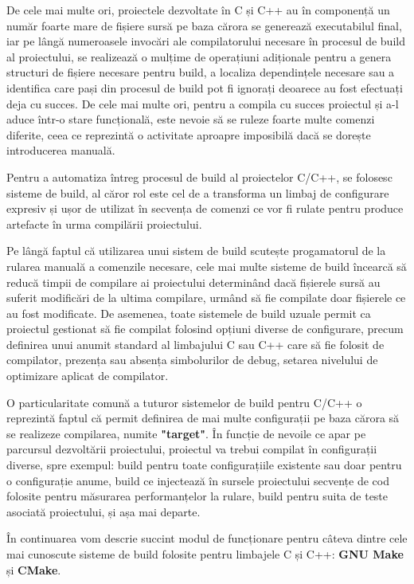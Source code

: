 De cele mai multe ori, proiectele dezvoltate în C și C++ au în componență un număr
foarte mare de fișiere sursă pe baza cărora se generează executabilul final, iar pe
lângă numeroasele invocări ale compilatorului necesare în procesul de build al proiectului,
se realizează o mulțime de operațiuni adiționale pentru a genera structuri de fișiere necesare
pentru build, a localiza dependințele necesare sau a identifica care pași din procesul de build
pot fi ignorați deoarece au fost efectuați deja cu succes. De cele mai multe ori, pentru a 
compila cu succes proiectul și a-l aduce într-o stare funcțională, este nevoie să se ruleze 
foarte multe comenzi diferite, ceea ce reprezintă o activitate aproapre imposibilă dacă se dorește
introducerea manuală.

Pentru a automatiza întreg procesul de build al proiectelor C/C++, se folosesc sisteme de build,
al căror rol este cel de a transforma un limbaj de configurare expresiv și ușor de utilizat în 
secvența de comenzi ce vor fi rulate pentru produce artefacte în urma compilării proiectului.

Pe lângă faptul că utilizarea unui sistem de build scutește progamatorul de la rularea manuală
a comenzile necesare, cele mai multe sisteme de build încearcă să reducă timpii de compilare ai
proiectului determinând dacă fișierele sursă au suferit modificări de la ultima compilare, urmând
să fie compilate doar fișierele ce au fost modificate. De asemenea, toate sistemele de build uzuale
permit ca proiectul gestionat să fie compilat folosind opțiuni diverse de configurare, precum
definirea unui anumit standard al limbajului C sau C++ care să fie folosit de compilator, prezența
sau absența simbolurilor de debug, setarea nivelului de optimizare aplicat de compilator.

O particularitate comună a tuturor sistemelor de build pentru C/C++ o reprezintă faptul că permit
definirea de mai multe configurații pe baza cărora să se realizeze compilarea, numite 
\textbf{"target"}\cite{stallman1988gnu}. În funcție de nevoile ce apar pe parcursul 
dezvoltării proiectului, proiectul va trebui compilat în configurații diverse, spre exempul:
build pentru toate configurațiile existente sau doar pentru o configurație anume, build ce injectează
în sursele proiectului secvențe de cod folosite pentru măsurarea performanțelor la rulare, build pentru
suita de teste asociată proiectului, și așa mai departe.

În continuarea vom descrie succint modul de funcționare pentru câteva dintre cele mai cunoscute
sisteme de build folosite pentru limbajele C și C++: \textbf{GNU Make}\cite{stallman1988gnu} și
\textbf{CMake}.

